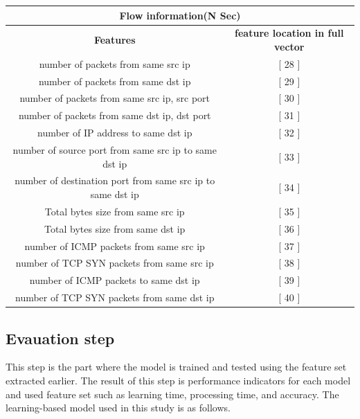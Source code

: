 \documentclass[fontsize=10pt]{article}
\begin{document}
\begin{center}
    \begin{tabular}{|c|c|}
        \multicolumn{2}{c}{\textbf{\large Flow information(N Sec)}} \\ \hline
        \textbf{Features}            & \textbf{feature location in full vector}         \\ \hline
        number of packets from same src ip                          & [ 28 ]    \\ \hline
        number of packets from same dst ip                          & [ 29 ]     \\ \hline
        number of packets from same src ip, src port                & [ 30 ]    \\ \hline
        number of packets from same dst ip, dst port                & [ 31 ]    \\ \hline
        number of IP address to same dst ip                         & [ 32 ]    \\ \hline
        number of source port from same src ip to same dst ip       & [ 33 ]    \\ \hline
        number of destination port from same src ip to same dst ip  & [ 34 ]    \\ \hline
        Total bytes size from same src ip                          & [ 35 ]    \\ \hline
        Total bytes size from same dst ip                          & [ 36 ]    \\ \hline
        number of ICMP packets from same src ip                     & [ 37 ]    \\ \hline
        number of TCP SYN packets from same src ip                  & [ 38 ]    \\ \hline
        number of ICMP packets to same dst ip                       & [ 39 ]    \\ \hline
        number of TCP SYN packets from same dst ip                  & [ 40 ]    \\ \hline
    \end{tabular}
\end{center}


\subsection{Evauation step}
This step is the part where the model is trained and tested using the feature set extracted earlier. The result of this step is performance indicators for each model and used feature set such as learning time, processing time, and accuracy. The learning-based model used in this study is as follows.
\end{document}
